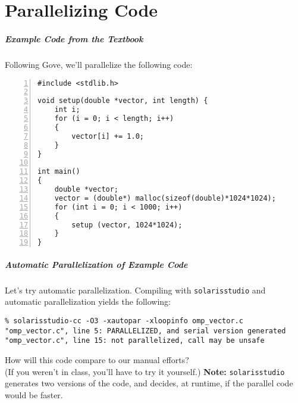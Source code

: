 \documentclass[aspectratio=43]{beamer}
\newenvironment{changemargin}[1]{%
  \begin{list}{}{%
    \setlength{\topsep}{0pt}%
    \setlength{\leftmargin}{#1}%
    \setlength{\rightmargin}{1em}
    \setlength{\listparindent}{\parindent}%
    \setlength{\itemindent}{\parindent}%
    \setlength{\parsep}{\parskip}%
  }%
  \item[]}{\end{list}}
\begin{document}
\part{Parallelizing Code}
\frame{\partpage}

\begin{frame}[fragile]
  \frametitle{Example Code from the Textbook}

\begin{changemargin}{1.5cm}
Following Gove, we'll parallelize the following code:

  \begin{lstlisting}[numbers=left]
#include <stdlib.h>

void setup(double *vector, int length) {
    int i;
    for (i = 0; i < length; i++)
    {
        vector[i] += 1.0;
    }
}

int main()
{
    double *vector;
    vector = (double*) malloc(sizeof(double)*1024*1024);
    for (int i = 0; i < 1000; i++)
    {
        setup (vector, 1024*1024);
    }
}
  \end{lstlisting}
\end{changemargin}
\end{frame}

\begin{frame}[fragile]
  \frametitle{Automatic Parallelization of Example Code}

\begin{changemargin}{1.5cm}
  Let's try automatic parallelization.
  \vfill
  Compiling with {\tt solarisstudio} and automatic parallelization yields
  the following:
\end{changemargin}

{\scriptsize
  \begin{lstlisting}
% solarisstudio-cc -O3 -xautopar -xloopinfo omp_vector.c 
"omp_vector.c", line 5: PARALLELIZED, and serial version generated                 
"omp_vector.c", line 15: not parallelized, call may be unsafe
  \end{lstlisting}
}
\begin{changemargin}{1.5cm}
  How will this code compare to our manual efforts? \\
  (If you weren't in class, you'll have to try it yourself.)
  \vfill
  {\bf Note:} {\tt solarisstudio} generates two versions of the code, 
  and decides, at runtime, if the parallel code would be faster.
\end{changemargin}

\end{frame}
\end{document}
